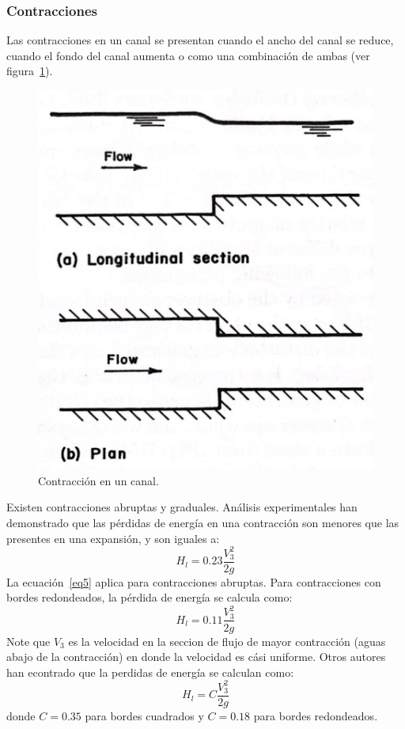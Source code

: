 \documentclass[11pt, oneside]{article}
\begin{document}
\subsubsection{Contracciones}
Las contracciones en un canal se presentan cuando el ancho del canal se reduce, cuando el fondo del canal aumenta o como una combinaci\'on de ambas (ver figura~\ref{fig74}). 
\begin{figure}[h]
    \centering
    \includegraphics[width=0.8\linewidth]{fig74.jpeg}
    \caption{Contracci\'on en un canal.}
    \label{fig74}
\end{figure}
Existen contracciones abruptas y graduales. An\'alisis experimentales han demonstrado que las p\'erdidas de energ\'ia en una contracci\'on son menores que las presentes en una expansi\'on, y son iguales a:
\begin{equation}
    H_l = 0.23\frac{V_3^2}{2g}
    \label{eq5}
\end{equation}
La ecuaci\'on~\ref{eq5} aplica para contracciones abruptas. Para contracciones con bordes redondeados, la p\'erdida de energ\'ia se calcula como:
\begin{equation}
    H_l = 0.11\frac{V_3^2}{2g}
    \label{eq5}
\end{equation}
Note que $V_3$ es la velocidad en la seccion de flujo de mayor contracci\'on (aguas abajo de la contracci\'on) en donde la velocidad es c\'asi uniforme. Otros autores han econtrado que la perdidas de energ\'ia se calculan como:
\begin{equation}
    H_l = C\frac{V_3^2}{2g}
    \label{eq5}
\end{equation}
donde $C=0.35$ para bordes cuadrados y $C=0.18$ para bordes redondeados. 
\end{document}
